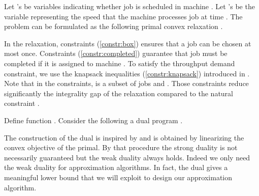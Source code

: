 \documentclass[11pt,a4paper]{article}
\begin{document}
Let 's be variables indicating whether job  
is scheduled in machine . 
Let 's be the variable representing the speed
that the machine  processes job  at time .  
The problem can be formulated as the following primal convex relaxation .

In the relaxation, constraints (\ref{constr:box}) ensures that a job can be chosen at most once.
Constraints (\ref{constr:completed}) guarantee that job  must be completed if it is assigned to 
machine . To satisfy the throughput demand constraint, we use the knapsack inequalities (\ref{constr:knapsack}) 
introduced in \cite{CarrFleischer00:Strengthening-integrality}. 
Note that in the constraints,   is a subset of jobs and .
Those constraints reduce significantly the integrality gap of the relaxation 
compared to the natural constraint .

Define function . 
Consider the following a dual program .

The construction of the dual  is inspired by \cite{DevanurJain12:Online-matching} 
and is obtained by linearizing the convex objective of the primal. 
By that procedure the strong duality is not necessarily guaranteed but the weak duality always holds. 
Indeed we only need the weak duality for approximation algorithms. 
In fact, the dual  gives a meaningful lower bound 
that we will exploit to design our approximation algorithm. 
\end{document}
